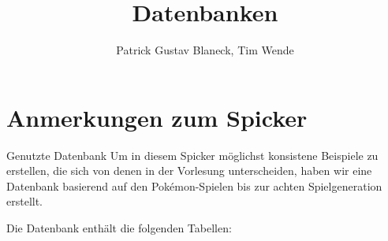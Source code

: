 \documentclass[german]{spicker}
\title{Datenbanken}
\author{Patrick Gustav Blaneck, Tim Wende}
\begin{document}
\maketitle
\tableofcontents
\newpage

\section{Anmerkungen zum Spicker}

\begin{info}{Genutzte Datenbank}
    Um in diesem Spicker möglichst konsistene Beispiele zu erstellen, die sich von denen in der Vorlesung unterscheiden, haben wir eine Datenbank basierend auf den Pokémon-Spielen bis zur achten Spielgeneration erstellt.

    Die Datenbank enthält die folgenden Tabellen:


\end{info}
\end{document}
